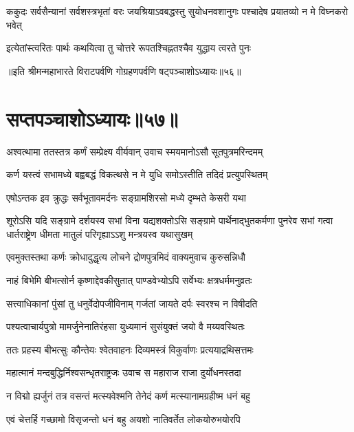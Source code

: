 \threelineshloka
{ककुदः सर्वसैन्यानां सर्वशस्त्रभृतां वरः}
{जयश्रियाऽवबद्धस्तु सुयोधनवशानुगः}
{पश्चादेष प्रयातव्यो न मे विघ्नकरो भवेत्}


\twolineshloka
{इत्येतांस्त्वरितः पार्थः कथयित्वा तु चोत्तरे}
{रूपतश्चिह्नतश्चैव युद्धाय त्वरते पुनः}

॥इति श्रीमन्महाभारते विराटपर्वणि गोग्रहणपर्वणि षट्पञ्चाशोऽध्यायः॥५६॥

\chapter{सप्तपञ्चाशोऽध्यायः॥५७॥}

\twolineshloka
{अश्वत्थामा ततस्तत्र कर्णं सम्प्रेक्ष्य वीर्यवान्}
{उवाच स्मयमानोऽसौ सूतपुत्रमरिन्दमम्}


\twolineshloka
{कर्ण यस्त्वं सभामध्ये बह्वबद्धं विकत्थसे}
{न मे युधि समोऽस्तीति तदिदं प्रत्युपस्थितम्}


\twolineshloka
{एषोऽन्तक इव क्रुद्धः सर्वभूतावमर्दनः}
{सङ्ग्रामशिरसो मध्ये दृम्भते केसरी यथा}


\onelineshloka
{शूरोऽसि यदि सङ्ग्रामे दर्शयस्व सभां विना}
\threelineshloka
{यद्यशक्तोऽसि सङ्ग्रामे पार्थेनाद्भुतकर्मणा}
{पुनरेव सभां गत्वा धार्तराष्ट्रेण धीमता}
{मातुलं परिगृह्याऽऽशु मन्त्रयस्व यथासुखम्}



\twolineshloka
{एवमुक्तस्तथा कर्णः क्रोधादुद्धृत्य लोचने}
{द्रोणपुत्रमिदं वाक्यमुवाच कुरुसन्निधौ}


\twolineshloka
{नाहं बिभेमि बीभत्सोर्न कृष्णाद्देवकीसुतात्}
{पाण्डवेभ्योऽपि सर्वेभ्यः क्षत्रधर्ममनुव्रतः}


\twolineshloka
{सत्त्वाधिकानां पुंसां तु धनुर्वेदोपजीविनाम्}
{गर्जतां जायते दर्पः स्वरश्च न विषीदति}


\twolineshloka
{पश्यत्वाचार्यपुत्रो मामर्जुनेनातिरंहसा}
{युध्यमानं सुसंयुक्तं जयो वै मय्यवस्थितः}



\twolineshloka
{ततः प्रहस्य बीभत्सुः कौन्तेयः श्वेतवाहनः}
{दिव्यमस्त्रं विकुर्वाणः प्रत्ययाद्रथिसत्तमः}


\twolineshloka
{महात्मानं मन्दबुद्धिर्निश्वसन्धृतराष्ट्रजः}
{उवाच स महाराज राजा दुर्योधनस्तदा}


\twolineshloka
{न विद्मो ह्यर्जुनं तत्र वसन्तं मत्स्यवेश्मनि}
{तेनेदं कर्ण मत्स्यानामग्रहीष्म धनं बहु}


\twolineshloka
{एवं चेत्तर्हि गच्छामो विसृजन्तो धनं बहु}
{अयशो नातिवर्तेत लोकयोरुभयोरपि}


